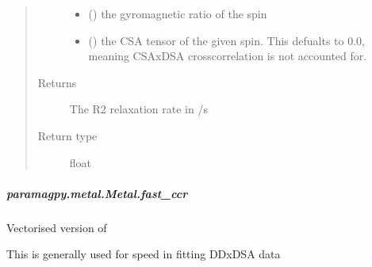 \documentclass[a4paper,10pt,english,openany,oneside]{sphinxmanual}
\begin{document}
\begin{fulllineitems}
\begin{fulllineitems}
\begin{fulllineitems}
\begin{quote}
\begin{description}
\begin{itemize}
\item {} 
 () \textendash{} the gyromagnetic ratio of the spin

\item {} 
 (\sphinxstyleliteralemphasis{\sphinxupquote{ (}}\sphinxstyleliteralemphasis{\sphinxupquote{)}}) \textendash{} the CSA tensor of the given spin.
This defualts to 0.0, meaning CSAxDSA crosscorrelation is
not accounted for.

\end{itemize}

\item[{Returns}] \leavevmode
{} \textendash{} The R2 relaxation rate in /s

\item[{Return type}] \leavevmode
float

\end{description}\end{quote}

\end{fulllineitems}



\subparagraph{paramagpy.metal.Metal.fast\_ccr}
\label{\detokenize{reference/generated/paramagpy.metal.Metal.fast_ccr:paramagpy-metal-metal-fast-ccr}}\label{\detokenize{reference/generated/paramagpy.metal.Metal.fast_ccr::doc}}

\begin{fulllineitems}
\label{\detokenize{reference/generated/paramagpy.metal.Metal.fast_ccr:paramagpy.metal.Metal.fast_ccr}}
Vectorised version of {\hyperref[\detokenize{reference/generated/paramagpy.metal.Metal.ccr:paramagpy.metal.Metal.ccr}]{}}

This is generally used for speed in fitting DDxDSA data


\end{fulllineitems}
\end{fulllineitems}
\end{fulllineitems}
\end{document}
